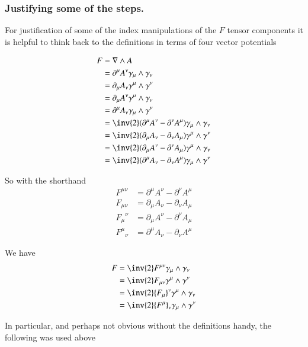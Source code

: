 \subsubsection{Justifying some of the steps. }

For justification of some of the 
index manipulations of the $F$ tensor components it is 
helpful to think back to the definitions in terms of four vector potentials

\begin{align*}
F &= \grad \wedge A \\
&= \partial^\mu A^\nu \gamma_\mu \wedge \gamma_\nu \\
&= \partial_\mu A_\nu \gamma^\mu \wedge \gamma^\nu \\
&= \partial_\mu A^\nu \gamma^\mu \wedge \gamma_\nu \\ 
&= \partial^\mu A_\nu \gamma_\mu \wedge \gamma^\nu \\
&= \inv{2}(\partial^\mu A^\nu -\partial^\nu A^\mu ) \gamma_\mu \wedge \gamma_\nu \\
&= \inv{2}(\partial_\mu A_\nu -\partial_\nu A_\mu ) \gamma^\mu \wedge \gamma^\nu \\
&= \inv{2}(\partial_\mu A^\nu -\partial^\nu A_\mu ) \gamma^\mu \wedge \gamma_\nu \\ 
&= \inv{2}(\partial^\mu A_\nu -\partial_\nu A^\mu ) \gamma_\mu \wedge \gamma^\nu
\end{align*}

So with the shorthand
\begin{align*}
F^{\mu\nu} &= \partial^\mu A^\nu -\partial^\nu A^\mu \\
F_{\mu\nu} &= \partial_\mu A_\nu -\partial_\nu A_\mu \\
{F_{\mu}}^{\nu} &= \partial_\mu A^\nu -\partial^\nu A_\mu \\
{F^{\mu}}_{\nu} &= \partial^\mu A_\nu -\partial_\nu A^\mu
\end{align*}

We have
\begin{align*}
F 
&= \inv{2}F^{\mu\nu} \gamma_\mu \wedge \gamma_\nu \\
&= \inv{2}F_{\mu\nu} \gamma^\mu \wedge \gamma^\nu \\
&= \inv{2}{F_\mu}^\nu \gamma^\mu \wedge \gamma_\nu \\ 
&= \inv{2}{F^\mu}_\nu \gamma_\mu \wedge \gamma^\nu
\end{align*}

In particular, and perhaps not obvious without the definitions handy, the following was used above

